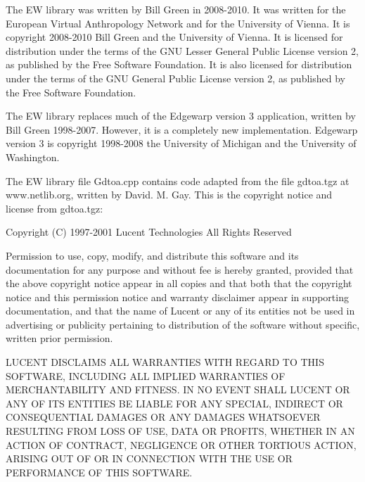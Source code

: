 
\begin{DoxyVerbInclude}
The EW library was written by Bill Green in 2008-2010.
It was written for the European Virtual Anthropology Network and for the
University of Vienna.
It is copyright 2008-2010 Bill Green and the University of Vienna.
It is licensed for distribution under the terms of the GNU Lesser General
Public License version 2, as published by the Free Software Foundation.
It is also licensed for distribution under the terms of the GNU General Public
License version 2, as published by the Free Software Foundation.

The EW library replaces much of the Edgewarp version 3 application,
written by Bill Green 1998-2007.
However, it is a completely new implementation.
Edgewarp version 3 is copyright 1998-2008 the University of Michigan and the
University of Washington.

The EW library file Gdtoa.cpp contains code adapted from the file gdtoa.tgz at
www.netlib.org, written by David. M. Gay.
This is the copyright notice and license from gdtoa.tgz:

    Copyright (C) 1997-2001 Lucent Technologies
    All Rights Reserved

    Permission to use, copy, modify, and distribute this software and
    its documentation for any purpose and without fee is hereby
    granted, provided that the above copyright notice appear in all
    copies and that both that the copyright notice and this
    permission notice and warranty disclaimer appear in supporting
    documentation, and that the name of Lucent or any of its entities
    not be used in advertising or publicity pertaining to
    distribution of the software without specific, written prior
    permission.

    LUCENT DISCLAIMS ALL WARRANTIES WITH REGARD TO THIS SOFTWARE,
    INCLUDING ALL IMPLIED WARRANTIES OF MERCHANTABILITY AND FITNESS.
    IN NO EVENT SHALL LUCENT OR ANY OF ITS ENTITIES BE LIABLE FOR ANY
    SPECIAL, INDIRECT OR CONSEQUENTIAL DAMAGES OR ANY DAMAGES
    WHATSOEVER RESULTING FROM LOSS OF USE, DATA OR PROFITS, WHETHER
    IN AN ACTION OF CONTRACT, NEGLIGENCE OR OTHER TORTIOUS ACTION,
    ARISING OUT OF OR IN CONNECTION WITH THE USE OR PERFORMANCE OF
    THIS SOFTWARE.
\end{DoxyVerbInclude}
 